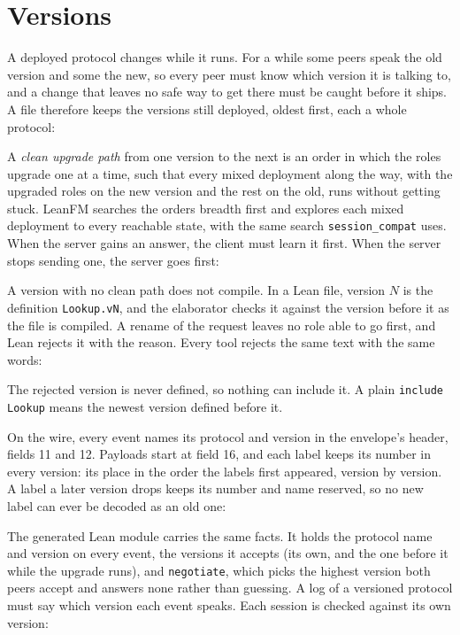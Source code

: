 \section{Versions}
\label{sec:versions}

A deployed protocol changes while it runs. For a while some peers speak the old
version and some the new, so every peer must know which version it is talking
to, and a change that leaves no safe way to get there must be caught before it
ships. A file therefore keeps the versions still deployed, oldest first, each a
whole protocol:



A \emph{clean upgrade path} from one version to the next is an order in which
the roles upgrade one at a time, such that every mixed deployment along the way,
with the upgraded roles on the new version and the rest on the old, runs without
getting stuck. LeanFM searches the orders breadth first and explores each mixed
deployment to every reachable state, with the same search
\texttt{session\_compat} uses. When the server gains an answer, the client must
learn it first. When the server stops sending one, the server goes first:



A version with no clean path does not compile. In a Lean file, version \(N\) is
the definition \texttt{Lookup.vN}, and the elaborator checks it against the
version before it as the file is compiled. A rename of the request leaves no
role able to go first, and Lean rejects it with the reason. Every tool rejects
the same text with the same words:



\noindent The rejected version is never defined, so nothing can include it. A
plain \texttt{include Lookup} means the newest version defined before it.

On the wire, every event names its protocol and version in the envelope's header,
fields 11 and 12. Payloads start at field 16, and each label keeps its number in
every version: its place in the order the labels first appeared, version by
version. A label a later version drops keeps its number and name reserved, so no
new label can ever be decoded as an old one:



The generated Lean module carries the same facts. It holds the protocol name and
version on every event, the versions it accepts (its own, and the one before it
while the upgrade runs), and \texttt{negotiate}, which picks the highest version
both peers accept and answers none rather than guessing. A log of a versioned
protocol must say which version each event speaks. Each session is checked
against its own version:

